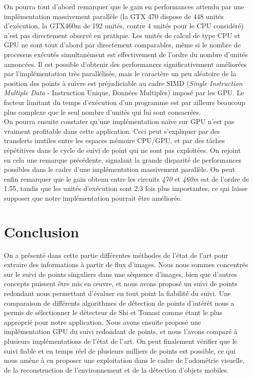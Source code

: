 On pourra tout d'abord remarquer que le gain en performances attendu par une implémentation massivement parallèle (la GTX 470 dispose de 448 unités d'exécution, la GTX460m de 192 unités, contre 4 unités pour le CPU considéré) n'est pas directement observé en pratique. Les unités de calcul de type \og CPU\fg{} et \og GPU\fg{} ne sont tout d'abord par directement comparables, même si le nombre de processus exécutés simultanément est effectivement de l'ordre du nombre d'unités annoncées. Il est possible d'obtenir des performances significativement améliorées par l'implémentation très parallélisée, mais le caractère un peu aléatoire de la position des points à suivre est préjudiciable au cadre SIMD (\emph{Single Instruction Multiple Data} - Instruction Unique, Données Multiples) imposé par les GPU. Le facteur limitant du temps d'exécution d'un programme est par ailleurs beaucoup plus complexe que le seul nombre d'unités qui lui sont consacrées. \\

On pourra ensuite constater qu'une implémentation \og naïve\fg{} sur GPU n'est pas vraiment profitable dans cette application. Ceci peut s'expliquer par des transferts inutiles entre les espaces mémoire CPU/GPU, et par des tâches répétitives dans le cycle de suivi de point qui ne sont pas exploitées. On rejoint en cela une remarque précédente, signalant la grande disparité de performances possibles dans le cadre d'une implémentation massivement parallèle. On peut enfin remarquer que le gain obtenu entre les circuits \emph{470} et \emph{460m} est de l'ordre de 1.55, tandis que les unités d'exécution sont 2.3 fois plus importantes, ce qui laisse supposer que notre implémentation pourrait être améliorée.

\section{Conclusion}
On a présenté dans cette partie différentes méthodes de l'état de l'art pour extraire des informations à partir de flux d'images. Nous nous sommes concentrés sur le suivi de points singuliers dans une séquence d'images, bien que d'autres concepts puissent être mis en œuvre, et nous avons proposé un suivi de points redondant nous permettant d'évaluer en tout point la fiabilité du suivi. Une comparaison de différents algorithmes de détection de points d'intérêt nous a permis de sélectionner le détecteur de Shi et Tomasi comme étant le plus approprié pour notre application. Nous avons ensuite proposé une implémentation GPU du suivi redondant de points, et nous l'avons comparé à plusieurs implémentations de l'état de l'art. On peut finalement vérifier que le suivi fiable et en temps réel de plusieurs milliers de points est possible, ce qui nous amène à en proposer une exploitation dans le cadre de l'odométrie visuelle, de la reconstruction de l'environnement et de la détection d'objets mobiles.
